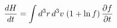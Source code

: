 \documentclass[preview]{standalone}
\begin{document}
\begin{align*}
\special{dvisvgm:raw <g id='unique000'>}\dv{H}{t}=\int d^3r\,d^3v\;(1+\ln f)\,\pdv{f}{t}\special{dvisvgm:raw </g>}
\end{align*}
\end{document}
